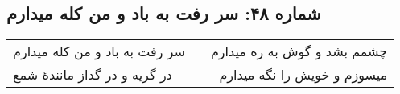 \begin{center}
\section*{شماره ۴۸: سر رفت به باد و من کله میدارم}
\label{sec:048}
\begin{longtable}{l p{0.5cm} r}
سر رفت به باد و من کله میدارم
&&
چشمم بشد و گوش به ره میدارم
\\
در گریه و در گداز مانندهٔ شمع
&&
میسوزم و خویش را نگه میدارم
\\
\end{longtable}
\end{center}

